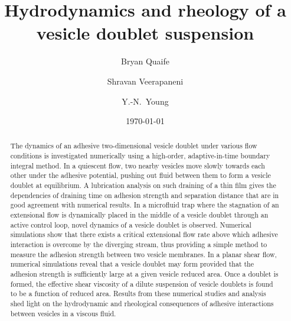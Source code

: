 \documentclass[prf,superscriptaddress,showkeys,longbibliography]{revtex4-1}
\begin{document}

\title{Hydrodynamics and rheology of a vesicle doublet suspension}

\author{Bryan Quaife}
\author{Shravan Veerapaneni}%
%
\author{Y.-N.~Young}%
%

\date{\today}%

\begin{abstract}
The dynamics of an adhesive two-dimensional vesicle doublet under
various flow conditions is investigated numerically using a high-order,
adaptive-in-time boundary integral method. In a quiescent flow, two
nearby vesicles move slowly towards each other under the adhesive
potential, pushing out fluid between them to form a vesicle doublet at
equilibrium. A lubrication analysis on such draining of a thin film
gives the dependencies of draining time on adhesion strength and
separation distance that are in good agreement with numerical results.
%
In a microfluid trap where the stagnation of an extensional flow is
dynamically placed in the middle of a vesicle doublet through an active
control loop, novel dynamics of a vesicle doublet is observed. Numerical
simulations show that there exists a critical extensional flow rate
above which adhesive interaction is overcome by the diverging stream,
thus providing a simple method to measure the adhesion strength between
two vesicle membranes. 
%
In a planar shear flow, numerical simulations reveal that a vesicle
doublet may form provided that the adhesion strength is sufficiently
large at a given vesicle reduced area. Once a doublet is formed, the
effective shear viscosity of a dilute suspension of vesicle doublets is
found to be a function of  reduced area.  Results from these numerical
studies and analysis shed light on the hydrodynamic and rheological
consequences of adhesive interactions between vesicles in a viscous
fluid.
\end{abstract}
\end{document}
